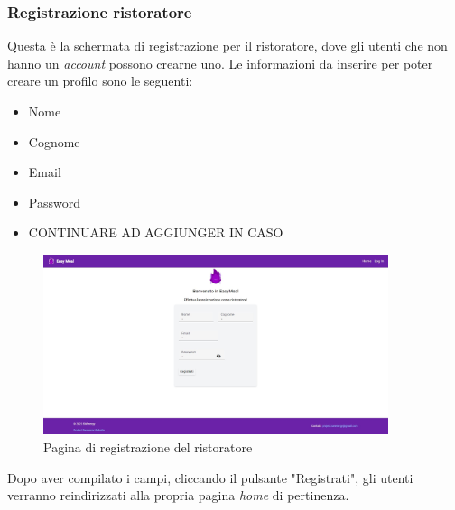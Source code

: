 \subsubsection{Registrazione ristoratore}
Questa è la schermata di registrazione per il ristoratore, dove gli utenti che non hanno un \textit{account} possono crearne uno.
Le informazioni da inserire per poter creare un profilo sono le seguenti:
\begin{itemize}
    \item Nome
    \item Cognome
    \item Email
    \item Password
    \item CONTINUARE AD AGGIUNGER IN CASO
\end{itemize}

\begin{figure}[h]
    \centering
    \includegraphics[width=0.9\textwidth]{./img/registrazioneRistoratore.jpg}
    \caption{Pagina di registrazione del ristoratore}
    \label{fig:esempio}
\end{figure}

Dopo aver compilato i campi, cliccando il pulsante "Registrati", gli utenti verranno reindirizzati alla propria pagina \textit{home} di pertinenza.
